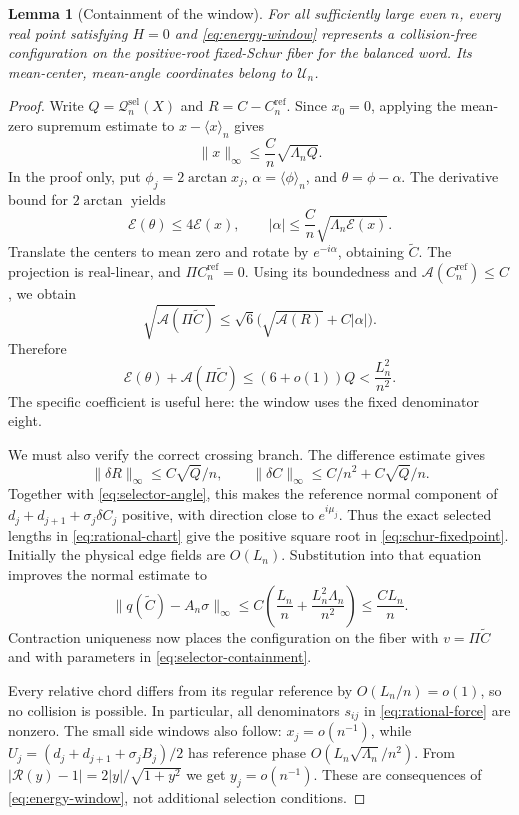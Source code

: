 \documentclass[11pt,reqno]{amsart}
\numberwithin{equation}{section}
\newtheorem{lemma}[theorem]{Lemma}
\theoremstyle{definition}
\theoremstyle{remark}
\newcommand{\A}{\mathcal A}
\newcommand{\E}{\mathcal E}
\newcommand{\av}[1]{\langle #1\rangle_n}
\newcommand{\norm}[1]{\lVert #1\rVert}
\newcommand{\dd}{\delta}
\newcommand{\UU}{\mathscr U_n}
\begin{document}
\begin{lemma}[Containment of the window]\label{lem:window-containment}
For all sufficiently large even $n$, every real point satisfying $H=0$ and \eqref{eq:energy-window} represents a collision-free configuration on the positive-root fixed-Schur fiber for the balanced word. Its mean-center, mean-angle coordinates belong to $\UU$.
\end{lemma}
\begin{proof}
Write $Q=\mathcal Q_n^{\mathrm{sel}}(X)$ and $R=C-C_n^{\mathrm{ref}}$. Since $x_0=0$, applying the mean-zero supremum estimate to $x-\av x$ gives
\[
 \norm x_\infty\le\frac Cn\sqrt{\Lambda_nQ}.
\]
In the proof only, put
$\phi_j=2\arctan x_j$, $\alpha=\av\phi$, and $\theta=\phi-\alpha$.
The derivative bound for $2\arctan$ yields
\begin{equation}\label{eq:selector-angle}
 \E(\theta)\le4\E(x),\qquad
 |\alpha|\le\frac Cn\sqrt{\Lambda_n\E(x)}.
\end{equation}
Translate the centers to mean zero and rotate by $e^{-i\alpha}$, obtaining $\widetilde C$. The projection is real-linear, and
$\Pi C_n^{\mathrm{ref}}=0$. Using its boundedness and
$\A(C_n^{\mathrm{ref}})\le C$, we obtain
\[
 \sqrt{\A(\Pi\widetilde C)}
 \le\sqrt6\bigl(\sqrt{\A(R)}+C|\alpha|\bigr).
\]
Therefore
\begin{equation}\label{eq:selector-containment}
 \E(\theta)+\A(\Pi\widetilde C)
 \le(6+o(1))Q<\frac{L_n^2}{n^2}.
\end{equation}
The specific coefficient is useful here: the window uses the fixed denominator eight.

We must also verify the correct crossing branch. The difference estimate gives
\[
 \norm{\dd R}_\infty\le C\sqrt Q/n,\qquad
 \norm{\dd C}_\infty\le C/n^2+C\sqrt Q/n.
\]
Together with \eqref{eq:selector-angle}, this makes the reference normal component of
$d_j+d_{j+1}+\sigma_j\dd C_j$ positive, with direction close to $e^{i\mu_j}$. Thus the exact selected lengths in \eqref{eq:rational-chart} give the positive square root in \eqref{eq:schur-fixedpoint}. Initially the physical edge fields are $O(L_n)$. Substitution into that equation improves the normal estimate to
\[
 \norm{q(\widetilde C)-A_n\sigma}_\infty
 \le C\left(\frac{L_n}{n}+\frac{L_n^2\Lambda_n}{n^2}\right)
 \le\frac{CL_n}{n}.
\]
Contraction uniqueness now places the configuration on the fiber with
$v=\Pi\widetilde C$ and with parameters in \eqref{eq:selector-containment}.

Every relative chord differs from its regular reference by $O(L_n/n)=o(1)$, so no collision is possible. In particular, all denominators $s_{ij}$ in \eqref{eq:rational-force} are nonzero. The small side windows also follow: $x_j=o(n^{-1})$, while
$U_j=(d_j+d_{j+1}+\sigma_jB_j)/2$ has reference phase
$O(L_n\sqrt{\Lambda_n}/n^2)$. From
$|\mathcal R(y)-1|=2|y|/\sqrt{1+y^2}$ we get $y_j=o(n^{-1})$.
These are consequences of \eqref{eq:energy-window}, not additional selection conditions.
\end{proof}
\end{document}
